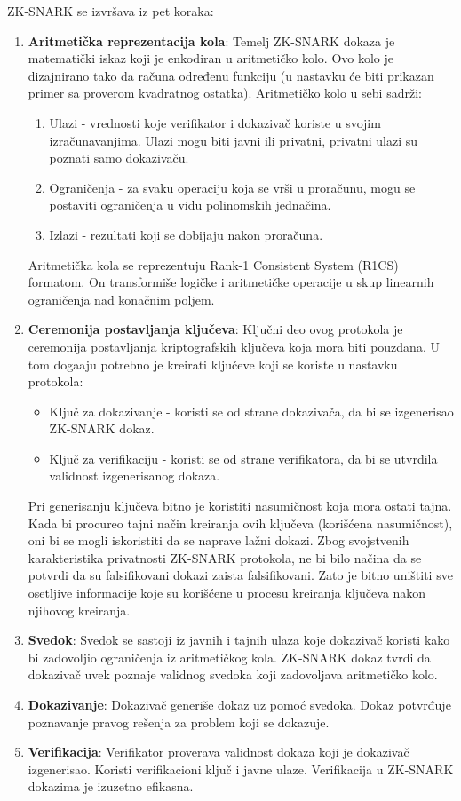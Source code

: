     \textenglish{ZK-SNARK} se izvršava iz pet koraka:
    \begin{enumerate}
    	\item {\bf Aritmetička reprezentacija kola}: Temelj \textenglish{ZK-SNARK} dokaza je matematički iskaz koji je enkodiran u aritmetičko kolo. Ovo kolo je dizajnirano tako da računa određenu funkciju (u nastavku će biti prikazan primer sa proverom kvadratnog ostatka). Aritmetičko kolo u sebi sadrži:
    	\begin{enumerate}
    		\item Ulazi - vrednosti koje verifikator i dokazivač koriste u svojim izračunavanjima. Ulazi mogu biti javni ili privatni, privatni ulazi su poznati samo dokazivaču.
    		\item Ograničenja - za svaku operaciju koja se vrši u proračunu, mogu se postaviti ograničenja u vidu polinomskih jednačina.
    		\item Izlazi - rezultati koji se dobijaju nakon proračuna.
    	\end{enumerate}
    
    	Aritmetička kola se reprezentuju \textenglish{Rank-1 Consistent System (R1CS)} formatom. On transformiše logičke i aritmetičke operacije u skup linearnih ograničenja nad konačnim poljem.
    	\item {\bf Ceremonija postavljanja ključeva}: Ključni deo ovog protokola je ceremonija postavljanja kriptografskih klju\v ceva  koja mora biti pouzdana. U tom doga\dj aju potrebno je kreirati klju\v ceve koji se koriste u nastavku protokola:
    	\begin{itemize}
    		\item Ključ za dokazivanje - koristi se od strane dokazivača, da bi se izgenerisao  \textenglish{ZK-SNARK} dokaz.
    		\item Ključ za verifikaciju - koristi se od strane verifikatora, da bi se utvrdila validnost izgenerisanog dokaza.
    	\end{itemize} 
     Pri generisanju ključeva bitno je koristiti  nasumičnost koja mora ostati tajna. Kada bi procureo tajni na\v cin kreiranja ovih klju\v ceva (korišćena nasumičnost), oni bi se mogli iskoristiti da se naprave la\v zni dokazi. Zbog svojstvenih karakteristika privatnosti \textenglish{ZK-SNARK} protokola, ne bi bilo načina da se potvrdi da su falsifikovani dokazi zaista falsifikovani. Zato je bitno uni\v stiti sve osetljive informacije koje su korišćene u procesu kreiranja ključeva nakon njihovog kreiranja.
    	\item {\bf Svedok}: Svedok se sastoji iz javnih i tajnih ulaza koje dokazivač koristi kako bi zadovoljio ograničenja iz aritmetičkog kola. \textenglish{ZK-SNARK} dokaz tvrdi da dokazivač uvek poznaje validnog svedoka koji zadovoljava aritmetičko kolo.
    	\item {\bf Dokazivanje}: Dokazivač generiše dokaz uz pomoć svedoka. Dokaz potvrđuje poznavanje pravog rešenja za problem koji se dokazuje.
    	\item {\bf Verifikacija}: Verifikator proverava validnost dokaza koji je dokazivač izgenerisao. Koristi verifikacioni ključ i javne ulaze. Verifikacija u \textenglish{ZK-SNARK} dokazima je izuzetno efikasna.
    \end{enumerate}

